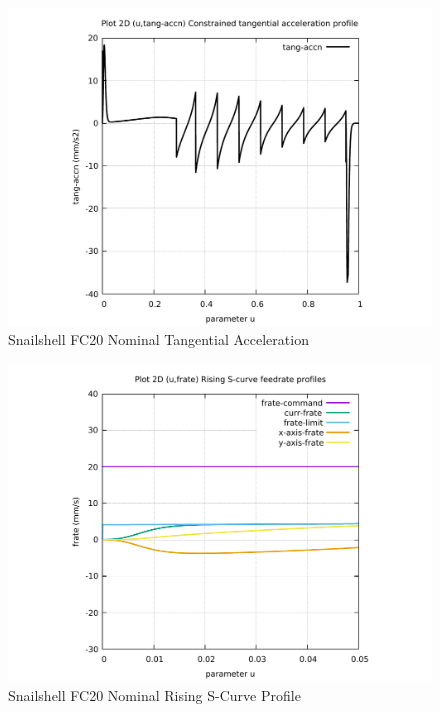 \begin{figure}
	\caption     {Snailshell FC20 Nominal Tangential Acceleration}
	\label{14-img-Snailshell-FC20-Nominal-Tangential-Acceleration.pdf}
	\includegraphics[width=1.00\textwidth]{Chap4/appendix/app-Snailshell/plots/14-img-Snailshell-FC20-Nominal-Tangential-Acceleration.pdf}
\end{figure}

\clearpage
\pagebreak

\begin{figure}
	\caption     {Snailshell FC20 Nominal Rising S-Curve Profile}
	\label{15-img-Snailshell-FC20-Nominal-Rising-S-Curve-Profile.pdf}
	\includegraphics[width=1.00\textwidth]{Chap4/appendix/app-Snailshell/plots/15-img-Snailshell-FC20-Nominal-Rising-S-Curve-Profile.pdf}
\end{figure}


